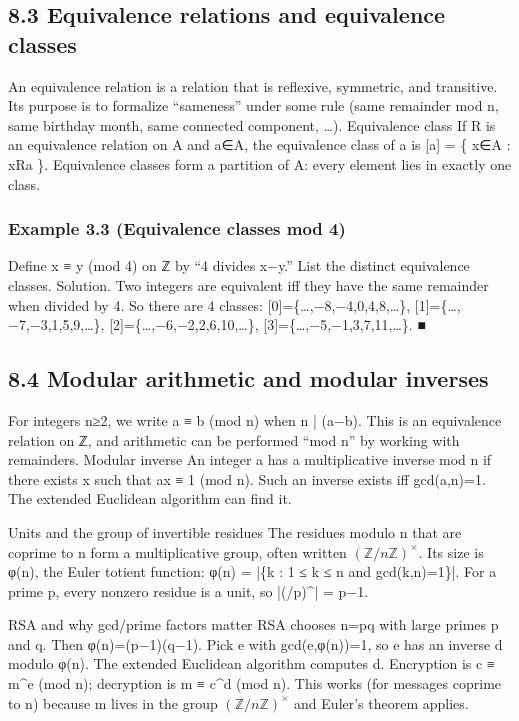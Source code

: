 \documentclass[11pt]{article}
\begin{document}
\subsection{8.3 Equivalence relations and equivalence classes}
An equivalence relation is a relation that is reflexive, symmetric, and transitive. Its
purpose is to formalize “sameness” under some rule (same remainder mod n, same
birthday month, same connected component, …).
Equivalence class
If R is an equivalence relation on A and a∈A, the equivalence class of a is [a] = \{
x∈A : xRa \}.
Equivalence classes form a partition of A: every element lies in exactly one class.
\subsubsection*{Example 3.3 (Equivalence classes mod 4)}
Define x ≡ y (mod 4) on ℤ by “4 divides x−y.” List the distinct equivalence classes.
Solution. Two integers are equivalent iff they have the same remainder when
divided by 4.
So there are 4 classes: [0]=\{…,−8,−4,0,4,8,…\}, [1]=\{…,−7,−3,1,5,9,…\},
[2]=\{…,−6,−2,2,6,10,…\}, [3]=\{…,−5,−1,3,7,11,…\}. ■
\subsection{8.4 Modular arithmetic and modular inverses}
For integers n≥2, we write a ≡ b (mod n) when n | (a−b). This is an equivalence relation
on ℤ, and arithmetic can be performed “mod n” by working with remainders.
Modular inverse
An integer a has a multiplicative inverse mod n if there exists x such that ax ≡ 1
(mod n).
Such an inverse exists iff gcd(a,n)=1. The extended Euclidean algorithm can find it.

Units and the group of invertible residues
The residues modulo n that are coprime to n form a multiplicative group, often written
$(\mathbb{Z}/n\mathbb{Z})^\times$. Its size is φ(n), the Euler totient function:
φ(n) = |\{k : 1 ≤ k ≤ n and gcd(k,n)=1\}|.
For a prime p, every nonzero residue is a unit, so |(/p)^\times| = p−1.

RSA and why gcd/prime factors matter
RSA chooses n=pq with large primes p and q. Then φ(n)=(p−1)(q−1).
Pick e with gcd(e,φ(n))=1, so e has an inverse d modulo φ(n). The extended Euclidean
algorithm computes d. Encryption is c ≡ m\textasciicircum{}e (mod n); decryption is
m ≡ c\textasciicircum{}d (mod n). This works (for messages coprime to n) because
m lives in the group $(\mathbb{Z}/n\mathbb{Z})^\times$ and Euler’s theorem applies.
\end{document}
